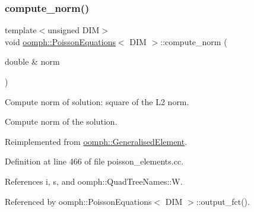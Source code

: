 \subsubsection{\texorpdfstring{compute\+\_\+norm()}{compute\_norm()}}
{\footnotesize\ttfamily template$<$unsigned D\+IM$>$ \\
void \hyperlink{classoomph_1_1PoissonEquations}{oomph\+::\+Poisson\+Equations}$<$ D\+IM $>$\+::compute\+\_\+norm (\begin{DoxyParamCaption}\item[{double \&}]{norm }\end{DoxyParamCaption})\hspace{0.3cm}{\ttfamily [virtual]}}



Compute norm of solution\+: square of the L2 norm. 

Compute norm of the solution. 

Reimplemented from \hyperlink{classoomph_1_1GeneralisedElement_af2025a472df6752a946739da58e7fb37}{oomph\+::\+Generalised\+Element}.



Definition at line 466 of file poisson\+\_\+elements.\+cc.



References i, s, and oomph\+::\+Quad\+Tree\+Names\+::W.



Referenced by oomph\+::\+Poisson\+Equations$<$ D\+I\+M $>$\+::output\+\_\+fct().

\mbox{\label{classoomph_1_1PoissonEquations_af68ad067d9a9d1bcbcc1ee3094b77a7a}} 
